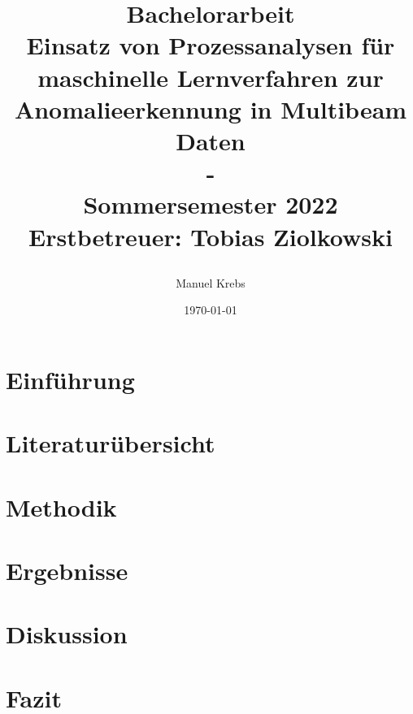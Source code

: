 \documentclass{report}
\title{
	\vspace*{-3cm}
	Bachelorarbeit\\
	Einsatz von Prozessanalysen für maschinelle Lernverfahren zur
	Anomalieerkennung in Multibeam Daten\\
	-\\
	\color{gray}
	Sommersemester 2022\\
	\vspace*{5mm}
	{Erstbetreuer: Tobias Ziolkowski}
	\author{Manuel Krebs}
}
\date{\today}
\begin{document}
	\maketitle	
	\tableofcontents
	
	\chapter{Einführung}\label{chp:einführung}
	
	
	\chapter{Literaturübersicht}\label{chp:literaturübersicht}
	
	
	\chapter{Methodik}\label{chp:methodik}
	
	
	\chapter{Ergebnisse}\label{chp:ergebnisse}
	
	
	\chapter{Diskussion}\label{chp:diskussion}
	
	
	\chapter{Fazit}\label{chp:fazit}
	
	
	
	
\end{document}
